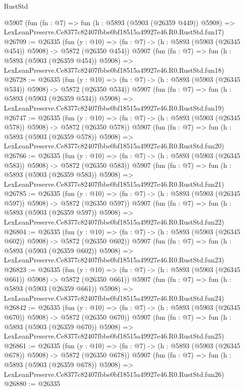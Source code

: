 \begin{lexlean}{RustStd}
\begin{coremodule}
    @5907
    (fun (fn : @7) =>
    fun (h : @5893 (@5903 (@26359 @449)) @5908) =>
    LexLeanPreserve.Ce8377c82407fbbe0bf18515a49927e46.R0.RustStd.fun17)
@26709 := @26335
    (fun (y : @10) => (fn : @7) -> (h : @5893 (@5903 (@26345 @454)) @5908) -> @5872 (@26350 @454))
    @5907
    (fun (fn : @7) =>
    fun (h : @5893 (@5903 (@26359 @454)) @5908) =>
    LexLeanPreserve.Ce8377c82407fbbe0bf18515a49927e46.R0.RustStd.fun18)
@26728 := @26335
    (fun (y : @10) => (fn : @7) -> (h : @5893 (@5903 (@26345 @534)) @5908) -> @5872 (@26350 @534))
    @5907
    (fun (fn : @7) =>
    fun (h : @5893 (@5903 (@26359 @534)) @5908) =>
    LexLeanPreserve.Ce8377c82407fbbe0bf18515a49927e46.R0.RustStd.fun19)
@26747 := @26335
    (fun (y : @10) => (fn : @7) -> (h : @5893 (@5903 (@26345 @578)) @5908) -> @5872 (@26350 @578))
    @5907
    (fun (fn : @7) =>
    fun (h : @5893 (@5903 (@26359 @578)) @5908) =>
    LexLeanPreserve.Ce8377c82407fbbe0bf18515a49927e46.R0.RustStd.fun20)
@26766 := @26335
    (fun (y : @10) => (fn : @7) -> (h : @5893 (@5903 (@26345 @583)) @5908) -> @5872 (@26350 @583))
    @5907
    (fun (fn : @7) =>
    fun (h : @5893 (@5903 (@26359 @583)) @5908) =>
    LexLeanPreserve.Ce8377c82407fbbe0bf18515a49927e46.R0.RustStd.fun21)
@26785 := @26335
    (fun (y : @10) => (fn : @7) -> (h : @5893 (@5903 (@26345 @597)) @5908) -> @5872 (@26350 @597))
    @5907
    (fun (fn : @7) =>
    fun (h : @5893 (@5903 (@26359 @597)) @5908) =>
    LexLeanPreserve.Ce8377c82407fbbe0bf18515a49927e46.R0.RustStd.fun22)
@26804 := @26335
    (fun (y : @10) => (fn : @7) -> (h : @5893 (@5903 (@26345 @602)) @5908) -> @5872 (@26350 @602))
    @5907
    (fun (fn : @7) =>
    fun (h : @5893 (@5903 (@26359 @602)) @5908) =>
    LexLeanPreserve.Ce8377c82407fbbe0bf18515a49927e46.R0.RustStd.fun23)
@26823 := @26335
    (fun (y : @10) => (fn : @7) -> (h : @5893 (@5903 (@26345 @661)) @5908) -> @5872 (@26350 @661))
    @5907
    (fun (fn : @7) =>
    fun (h : @5893 (@5903 (@26359 @661)) @5908) =>
    LexLeanPreserve.Ce8377c82407fbbe0bf18515a49927e46.R0.RustStd.fun24)
@26842 := @26335
    (fun (y : @10) => (fn : @7) -> (h : @5893 (@5903 (@26345 @670)) @5908) -> @5872 (@26350 @670))
    @5907
    (fun (fn : @7) =>
    fun (h : @5893 (@5903 (@26359 @670)) @5908) =>
    LexLeanPreserve.Ce8377c82407fbbe0bf18515a49927e46.R0.RustStd.fun25)
@26861 := @26335
    (fun (y : @10) => (fn : @7) -> (h : @5893 (@5903 (@26345 @678)) @5908) -> @5872 (@26350 @678))
    @5907
    (fun (fn : @7) =>
    fun (h : @5893 (@5903 (@26359 @678)) @5908) =>
    LexLeanPreserve.Ce8377c82407fbbe0bf18515a49927e46.R0.RustStd.fun26)
@26880 := @26335

\end{coremodule}
\end{lexlean}
